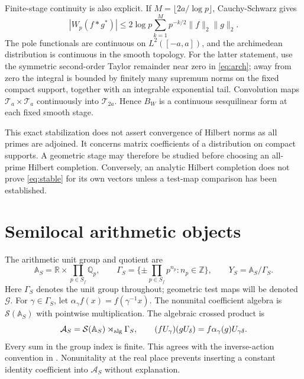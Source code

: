 \documentclass[11pt,letterpaper]{article}
\theoremstyle{definition}
\theoremstyle{remark}
\newcommand{\R}{\mathbb R}
\newcommand{\Q}{\mathbb Q}
\newcommand{\Z}{\mathbb Z}
\newcommand{\T}{\mathcal T}
\newcommand{\Sch}{\mathcal S}
\newcommand{\Acal}{\mathcal A}
\begin{document}
Finite-stage continuity is also explicit. If $M=\lfloor2a/\log p\rfloor$,
Cauchy-Schwarz gives
\begin{equation}
 |W_p(f*g^*)|\le
 2\log p\sum_{k=1}^M p^{-k/2}\|f\|_2\|g\|_2.
 \label{eq:finite-local-bound}
\end{equation}
The pole functionals are continuous on $L^2([-a,a])$, and the
archimedean distribution is continuous in the smooth topology.
For the latter statement, use the symmetric second-order Taylor
remainder near zero in \eqref{eq:arch}; away from zero the integral
is bounded by finitely many supremum norms on the fixed compact
support, together with an integrable exponential tail. Convolution
maps $\T_a\times\T_a$ continuously into $\T_{2a}$. Hence $B_W$
is a continuous sesquilinear form at each fixed smooth stage.

This exact stabilization does not assert convergence of Hilbert norms
as all primes are adjoined. It concerns matrix coefficients of a
distribution on compact supports. A geometric stage may therefore be
studied before choosing an all-prime Hilbert completion. Conversely,
an analytic Hilbert completion does not prove \eqref{eq:stable} for
its own vectors unless a test-map comparison has been established.

\section{Semilocal arithmetic objects}

The arithmetic unit group and quotient are
\begin{equation}
 \mathbb A_S=\R\times\prod_{p\in S_f}\Q_p,\qquad
 \Gamma_S=\{\pm\prod_{p\in S_f}p^{n_p}:n_p\in\Z\},\qquad
 Y_S=\mathbb A_S/\Gamma_S.
 \label{eq:adelic-objects}
\end{equation}
Here $\Gamma_S$ denotes the unit group throughout; geometric test
maps will be denoted $\mathcal G$. For $\gamma\in\Gamma_S$, let
$\alpha_\gamma f(x)=f(\gamma^{-1}x)$. The nonunital coefficient
algebra is $\Sch(\mathbb A_S)$ with pointwise multiplication.
The algebraic crossed product is
\begin{equation}
 \Acal_S=\Sch(\mathbb A_S)\rtimes_{\rm alg}\Gamma_S,\qquad
 (fU_\gamma)(gU_\delta)=f\alpha_\gamma(g)U_{\gamma\delta}.
 \label{eq:crossed-product}
\end{equation}
Every sum in the group index is finite. This agrees with the
inverse-action convention in \cite[Section 4, equations (4.3) to
(4.6)]{CCMar}. Nonunitality at the real place prevents inserting a
constant identity coefficient into $\Acal_S$ without explanation.
\end{document}
